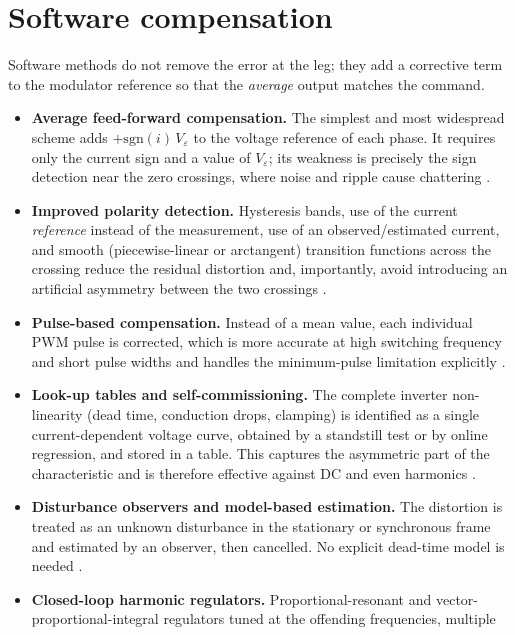 \documentclass[11pt,a4paper]{article}
\begin{document}
\section{Software compensation}

Software methods do not remove the error at the leg; they add a corrective term to the
modulator reference so that the \emph{average} output matches the command.

\begin{itemize}
\item \textbf{Average feed-forward compensation.} The simplest and most widespread scheme
adds $+\mathrm{sgn}(i)\,V_{\!\varepsilon}$ to the voltage reference of each phase. It
requires only the current sign and a value of $V_{\!\varepsilon}$; its weakness is
precisely the sign detection near the zero crossings, where noise and ripple cause
chattering \cite{jeong1991,choi1995,choi1996,sukegawa1991}.
\item \textbf{Improved polarity detection.} Hysteresis bands, use of the current
\emph{reference} instead of the measurement, use of an observed/estimated current, and
smooth (piecewise-linear or arctangent) transition functions across the crossing reduce
the residual distortion and, importantly, avoid introducing an artificial asymmetry
between the two crossings \cite{benbrahim2004,urasaki2005,hwang2010}.
\item \textbf{Pulse-based compensation.} Instead of a mean value, each individual PWM
pulse is corrected, which is more accurate at high switching frequency and short pulse
widths and handles the minimum-pulse limitation explicitly
\cite{leggate1997,oliveira2007}.
\item \textbf{Look-up tables and self-commissioning.} The complete inverter non-linearity
(dead time, conduction drops, clamping) is identified as a single current-dependent
voltage curve, obtained by a standstill test or by online regression, and stored in a
table. This captures the asymmetric part of the characteristic and is therefore effective
against DC and even harmonics \cite{pellegrino2010,bedetti2015,cichowski2005}.
\item \textbf{Disturbance observers and model-based estimation.} The distortion is treated
as an unknown disturbance in the stationary or synchronous frame and estimated by an
observer, then cancelled. No explicit dead-time model is needed
\cite{kim2003,kim2010,munoz1999}.
\item \textbf{Closed-loop harmonic regulators.} Proportional-resonant and
vector-proportional-integral regulators tuned at the offending frequencies, multiple

\end{itemize}
\end{document}
